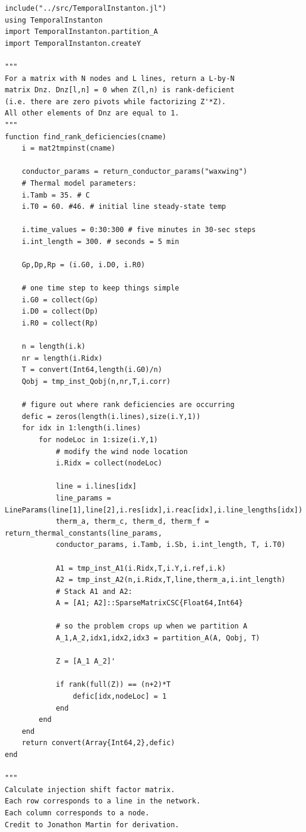 \documentclass[10pt,letterpaper]{article}
\begin{document}
\begin{verbatim}
include("../src/TemporalInstanton.jl")
using TemporalInstanton
import TemporalInstanton.partition_A
import TemporalInstanton.createY

"""
For a matrix with N nodes and L lines, return a L-by-N
matrix Dnz. Dnz[l,n] = 0 when Z(l,n) is rank-deficient
(i.e. there are zero pivots while factorizing Z'*Z).
All other elements of Dnz are equal to 1.
"""
function find_rank_deficiencies(cname)
    i = mat2tmpinst(cname)

    conductor_params = return_conductor_params("waxwing")
    # Thermal model parameters:
    i.Tamb = 35. # C
    i.T0 = 60. #46. # initial line steady-state temp

    i.time_values = 0:30:300 # five minutes in 30-sec steps
    i.int_length = 300. # seconds = 5 min

    Gp,Dp,Rp = (i.G0, i.D0, i.R0)

    # one time step to keep things simple
    i.G0 = collect(Gp)
    i.D0 = collect(Dp)
    i.R0 = collect(Rp)

    n = length(i.k)
    nr = length(i.Ridx)
    T = convert(Int64,length(i.G0)/n)
    Qobj = tmp_inst_Qobj(n,nr,T,i.corr)

    # figure out where rank deficiencies are occurring
    defic = zeros(length(i.lines),size(i.Y,1))
    for idx in 1:length(i.lines)
        for nodeLoc in 1:size(i.Y,1)
            # modify the wind node location
            i.Ridx = collect(nodeLoc)

            line = i.lines[idx]
            line_params = LineParams(line[1],line[2],i.res[idx],i.reac[idx],i.line_lengths[idx])
            therm_a, therm_c, therm_d, therm_f = return_thermal_constants(line_params,
            conductor_params, i.Tamb, i.Sb, i.int_length, T, i.T0)

            A1 = tmp_inst_A1(i.Ridx,T,i.Y,i.ref,i.k)
            A2 = tmp_inst_A2(n,i.Ridx,T,line,therm_a,i.int_length)
            # Stack A1 and A2:
            A = [A1; A2]::SparseMatrixCSC{Float64,Int64}

            # so the problem crops up when we partition A
            A_1,A_2,idx1,idx2,idx3 = partition_A(A, Qobj, T)

            Z = [A_1 A_2]'

            if rank(full(Z)) == (n+2)*T
                defic[idx,nodeLoc] = 1
            end
        end
    end
    return convert(Array{Int64,2},defic)
end

"""
Calculate injection shift factor matrix.
Each row corresponds to a line in the network.
Each column corresponds to a node.
Credit to Jonathon Martin for derivation.


\end{verbatim}
\end{document}
